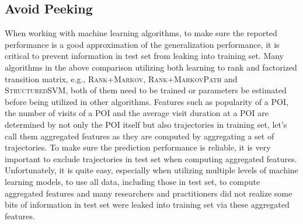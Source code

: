 \subsection{Avoid Peeking}
When working with machine learning algorithms, to make sure the reported performance is a good approximation
of the generalization performance, it is critical to prevent information in test set from leaking into
training set.
Many algorithms in the above comparison utilizing both learning to rank and factorized transition matrix,
e.g., \textsc{Rank+Markov}, \textsc{Rank+MarkovPath} and \textsc{StructuredSVM},
both of them need to be trained or parameters be estimated before being utilized in other algorithms.
Features such as popularity of a POI, the number of visits of a POI and the average visit duration at a POI are
determined by not only the POI itself but also trajectories in training set, let's call them aggregated features as they are
computed by aggregating a set of trajectories.
To make sure the prediction performance is reliable, it is very important to exclude trajectories in test set
when computing aggregated features.
Unfortunately, it is quite easy, especially when utilizing multiple levels of machine learning models,
to use all data, including those in test set, to compute aggregated features and many researchers and
practitioners did not realize some bits of information in test set were leaked into training set via these aggregated features.

